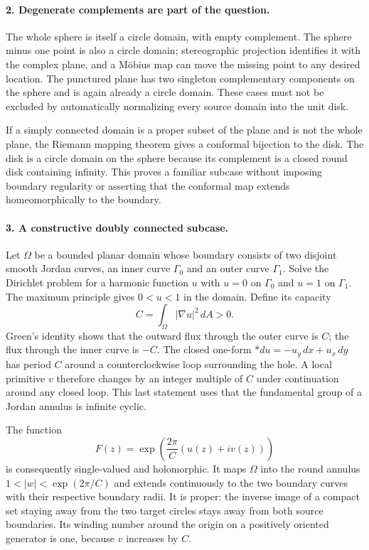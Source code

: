\documentclass[11pt]{article}
\begin{document}
\paragraph{2. Degenerate complements are part of the question.}
The whole sphere is itself a circle domain, with empty complement. The sphere minus one point is also a circle domain; stereographic projection identifies it with the complex plane, and a M\"obius map can move the missing point to any desired location. The punctured plane has two singleton complementary components on the sphere and is again already a circle domain. These cases must not be excluded by automatically normalizing every source domain into the unit disk.

If a simply connected domain is a proper subset of the plane and is not the whole plane, the Riemann mapping theorem gives a conformal bijection to the disk. The disk is a circle domain on the sphere because its complement is a closed round disk containing infinity. This proves a familiar subcase without imposing boundary regularity or asserting that the conformal map extends homeomorphically to the boundary.

\paragraph{3. A constructive doubly connected subcase.}
Let $\Omega$ be a bounded planar domain whose boundary consists of two disjoint smooth Jordan curves, an inner curve $\Gamma_0$ and an outer curve $\Gamma_1$. Solve the Dirichlet problem for a harmonic function $u$ with $u=0$ on $\Gamma_0$ and $u=1$ on $\Gamma_1$. The maximum principle gives $0<u<1$ in the domain. Define its capacity
\[
 C=\int_\Omega |\nabla u|^2\,dA>0.
\]
Green's identity shows that the outward flux through the outer curve is $C$; the flux through the inner curve is $-C$. The closed one-form $*du=-u_y\,dx+u_x\,dy$ has period $C$ around a counterclockwise loop surrounding the hole. A local primitive $v$ therefore changes by an integer multiple of $C$ under continuation around any closed loop. This last statement uses that the fundamental group of a Jordan annulus is infinite cyclic.

The function
\[
 F(z)=\exp\left(\frac{2\pi}{C}(u(z)+iv(z))\right)
\]
is consequently single-valued and holomorphic. It maps $\Omega$ into the round annulus $1<|w|<\exp(2\pi/C)$ and extends continuously to the two boundary curves with their respective boundary radii. It is proper: the inverse image of a compact set staying away from the two target circles stays away from both source boundaries. Its winding number around the origin on a positively oriented generator is one, because $v$ increases by $C$.
\end{document}
